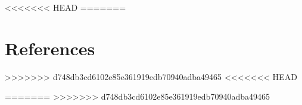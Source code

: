 \documentclass[11pt,a4paper]{article}
\begin{document}










<<<<<<< HEAD
=======
\newpage



\part*{References}

%
\setlength{\bibhang}{0pt}


>>>>>>> d748db3cd6102e85e361919edb70940adba49465
<<<<<<< HEAD

=======
>>>>>>> d748db3cd6102e85e361919edb70940adba49465
\end{document}
